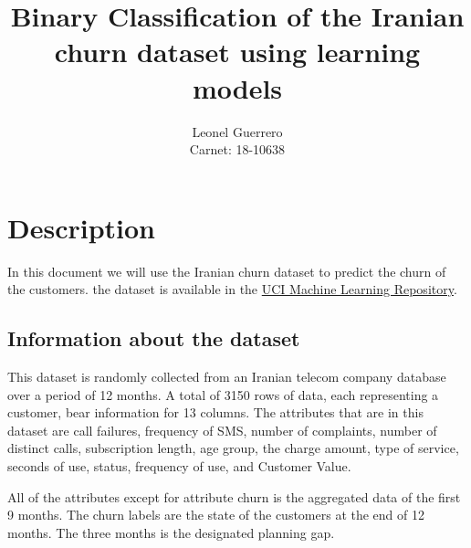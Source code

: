 \documentclass{article}
\title{Binary Classification of the Iranian churn dataset using learning models}
\author{Leonel Guerrero  \\ Carnet: 18-10638}
\theoremstyle{mytheoremstyle}
\theoremstyle{mytheoremstyle}
\theoremstyle{myproblemstyle}
\begin{document}
\maketitle

\section*{Description}

In this document we will use the Iranian churn dataset to predict the churn of the customers. the dataset is available in the \href{https://archive-beta.ics.uci.edu/dataset/592/iranian+churn+dataset}{UCI Machine Learning Repository}.

\subsection*{Information about the dataset}

This dataset is randomly collected from an Iranian telecom company database over a period of 12 months. A total of 3150 rows of data, each representing a customer, bear information for 13 columns. The attributes that are in this dataset are call failures, frequency of SMS, number of complaints, number of distinct calls, subscription length, age group, the charge amount, type of service, seconds of use, status, frequency of use, and Customer Value.

All of the attributes except for attribute churn is the aggregated data of the first 9 months. The churn labels are the state of the customers at the end of 12 months. The three months is the designated planning gap.
\end{document}
